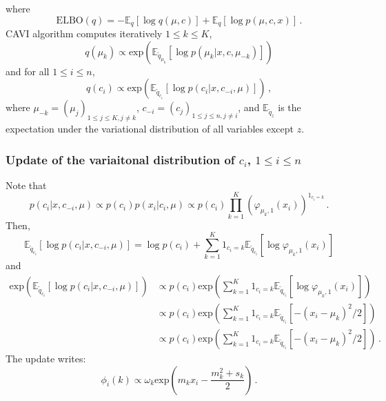 \documentclass[english,graybox,envcountchap,envcountsame,sectrefs,shortlabels]{svmono}
\theoremstyle{style}
\begin{document}
where
$$
\mathrm{ELBO}(q) = -\mathbb{E}_q[\log q(\mu,c)] + \mathbb{E}_q[\log p(\mu,c,x)] \,.
$$
CAVI algorithm computes iteratively $1\leqslant k \leqslant K$,
$$
q(\mu_k) \propto \mathrm{exp}\left(\mathbb{E}_{\tilde q_{\mu_k}}[\log p(\mu_k|x,c,\mu_{-k})]\right)
$$
and for all $1\leqslant i \leqslant n$,
$$
q(c_i) \propto \mathrm{exp}\left(\mathbb{E}_{\tilde q_{c_i}}[\log p(c_i|x,c_{-i},\mu)]\right)\,,
$$
where $\mu_{-k} = (\mu_j)_{1\leq j \leq K, j\neq k}$, $c_{-i} = (c_j)_{1\leq j \leq n, j\neq i}$, and  $\mathbb{E}_{\tilde q_z}$ is the expectation under the variational distribution of all variables except $z$. 
\subsubsection*{Update of the variaitonal distribution of $c_i$, $1\leq i \leq n$}
Note that
$$
p(c_i|x,c_{-i},\mu) \propto p(c_i)p(x_i|c_i,\mu) \propto p(c_i)\prod_{k=1}^K \left(\varphi_{\mu_k,1}(x_i)\right)^{1_{c_i=k}}\,. 
$$
Then,
$$
\mathbb{E}_{\tilde q_{c_i}}[\log p(c_i|x,c_{-i},\mu)] = \log p(c_i) + \sum_{k=1}^K 1_{c_i=k} \mathbb{E}_{\tilde q_{c_i}}[\log \varphi_{\mu_k,1}(x_i)]
$$
and
\begin{align*}
\mathrm{exp}\left(\mathbb{E}_{\tilde q_{c_i}}[\log p(c_i|x,c_{-i},\mu)]\right) &\propto p(c_i) \mathrm{exp}\left(\sum_{k=1}^K 1_{c_i=k} \mathbb{E}_{\tilde q_{c_i}}[\log \varphi_{\mu_k,1}(x_i)]\right)\,\\
&\propto p(c_i) \mathrm{exp}\left(\sum_{k=1}^K 1_{c_i=k} \mathbb{E}_{\tilde q_{c_i}}[-(x_i-\mu_k)^2/2]\right)\,\\
&\propto p(c_i) \mathrm{exp}\left(\sum_{k=1}^K 1_{c_i=k} \mathbb{E}_{\tilde q_{c_i}}[-(x_i-\mu_k)^2/2]\right)\,.
\end{align*}
The update writes:
$$
\phi_i(k) \propto \omega_k\mathrm{exp}\left(m_k x_i - \frac{m^2_k + s_k}{2}\right)\,.
$$
\end{document}
